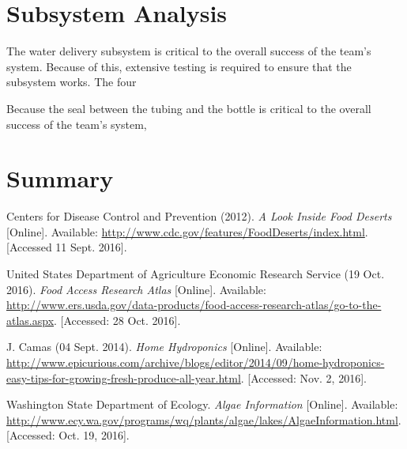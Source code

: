 \documentclass[12pt]{article}
\begin{document}
\section{Subsystem Analysis}


The water delivery subsystem is critical to the overall success of the team's system. Because of
this, extensive testing is required to ensure that the subsystem works. The four 

Because the seal between the tubing and the bottle is critical to the overall success of the team's
system, 



\section{Summary}


\pagebreak

\begin{thebibliography}{9}
    Centers for Disease Control and Prevention (2012).
    \textit{A Look Inside Food Deserts} [Online].
    Available: \url{http://www.cdc.gov/features/FoodDeserts/index.html}.
    [Accessed 11 Sept. 2016].

    United States Department of Agriculture Economic Research Service (19 Oct. 2016).
    \textit{Food Access Research Atlas} [Online].
    Available:
    \url{http://www.ers.usda.gov/data-products/food-access-research-atlas/go-to-the-atlas.aspx}.
    [Accessed: 28 Oct. 2016].

    J. Camas (04 Sept. 2014).
    \textit{Home Hydroponics} [Online].
    Available:
    \url{http://www.epicurious.com/archive/blogs/editor/2014/09/home-hydroponics-easy-tips-for-growing-fresh-produce-all-year.html}.
    [Accessed: Nov. 2, 2016].

    Washington State Department of Ecology.
    \textit{Algae Information} [Online].
    Available: \url{http://www.ecy.wa.gov/programs/wq/plants/algae/lakes/AlgaeInformation.html}.
    [Accessed: Oct. 19, 2016].

\end{thebibliography}
\end{document}
